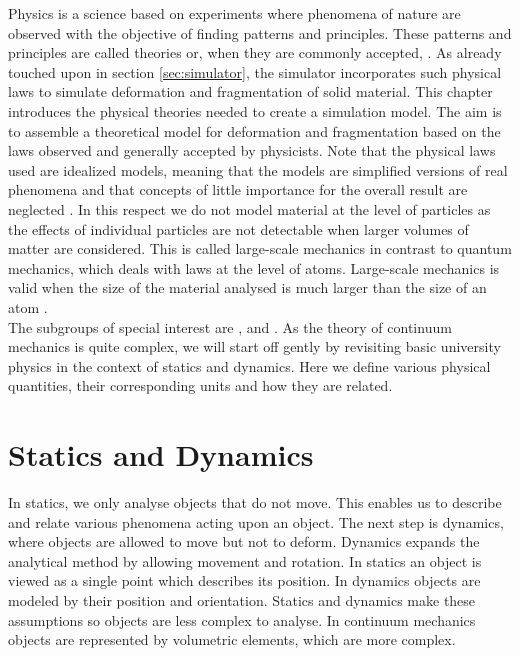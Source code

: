 
Physics is a science based on experiments where phenomena of nature
are observed with the objective of finding patterns and
principles. These patterns and principles are called theories or, when
they are commonly accepted, 
.
%
As already touched upon in section \vref{sec:simulator}, the
simulator incorporates such physical laws to simulate
deformation and fragmentation of solid material. This
chapter introduces the physical theories needed to create a
 simulation model.
%
The aim is to assemble a theoretical model for deformation and
fragmentation based on the laws observed and generally accepted by
physicists.
%
Note that the physical laws used are idealized models, meaning
that the models are simplified versions of real phenomena and that
concepts of little importance for the overall result are neglected
.
%
In this respect we do not model material at the level of particles
as the effects of individual particles are not detectable when
larger volumes of matter are considered. This is called large-scale
mechanics in contrast to quantum mechanics, which deals with laws at
the level of atoms. Large-scale mechanics is valid when the size of
the material analysed is much larger than the size of an atom
. \\

The subgroups of special interest are ,
 and .
%
As the theory of continuum mechanics is quite complex, we will start
off gently by revisiting basic university physics in the context of
statics and dynamics. Here we define various physical quantities,
their corresponding units and how they are related.


\section{Statics and Dynamics}
In statics, we only analyse objects that do not move. This enables
us to describe and relate various phenomena acting upon an object.
%
The next step is dynamics, where objects are allowed to move
but not to deform. Dynamics expands the analytical
method by allowing movement and rotation.
%
In statics an object is viewed as a single point which describes its
position. In dynamics objects are modeled by their position and
orientation. Statics and dynamics make these assumptions so objects
are less complex to analyse. In continuum mechanics objects are
represented by volumetric elements, which are more complex.

